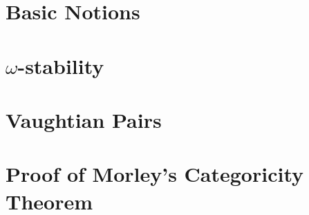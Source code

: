 \documentclass[12pt]{report}
\begin{document}








\section{Basic Notions}

\section{\(\omega\)-stability}

\section{Vaughtian Pairs}

\section{Proof of Morley's Categoricity Theorem}


%
\end{document}
